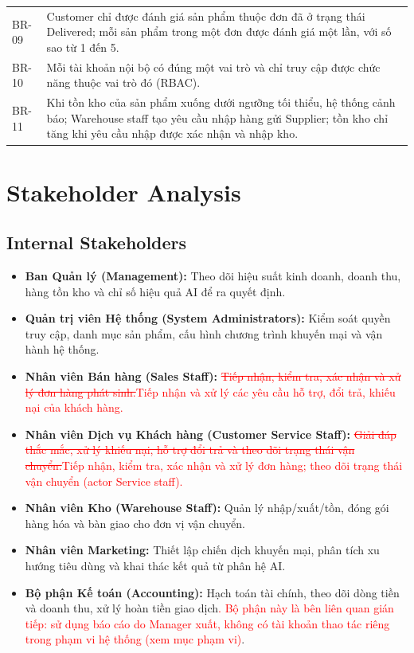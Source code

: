 \documentclass[12pt,a4paper,oneside]{report}
\newif\ifmark \marktrue
\newcommand{\chg}[1]{\ifmark\textcolor{red}{#1}\else #1\fi}
\newcommand{\del}[1]{\ifmark\textcolor{red}{\sout{#1}}\fi}
\newenvironment{chgblock}{\ifmark\color{red}\fi}{}
\begin{document}
\begin{chgblock}
\begin{longtable}{p{1.4cm}p{14.4cm}}
BR-09 & Customer chỉ được đánh giá sản phẩm thuộc đơn đã ở trạng thái Delivered; mỗi sản phẩm trong một đơn được đánh giá một lần, với số sao từ 1 đến 5. \\
BR-10 & Mỗi tài khoản nội bộ có đúng một vai trò và chỉ truy cập được chức năng thuộc vai trò đó (RBAC). \\
BR-11 & Khi tồn kho của sản phẩm xuống dưới ngưỡng tối thiểu, hệ thống cảnh báo; Warehouse staff tạo yêu cầu nhập hàng gửi Supplier; tồn kho chỉ tăng khi yêu cầu nhập được xác nhận và nhập kho. \\
\end{longtable}
\end{chgblock}

\section{Stakeholder Analysis}

\subsection{Internal Stakeholders}

\begin{itemize}
  \item \textbf{Ban Quản lý (Management):} Theo dõi hiệu suất kinh doanh, doanh thu, hàng tồn kho và chỉ số hiệu quả AI để ra quyết định.
  \item \textbf{Quản trị viên Hệ thống (System Administrators):} Kiểm soát quyền truy cập, danh mục sản phẩm, cấu hình chương trình khuyến mại và vận hành hệ thống.
  \item \textbf{Nhân viên Bán hàng (Sales Staff):} \del{Tiếp nhận, kiểm tra, xác nhận và xử lý đơn hàng phát sinh.}\chg{Tiếp nhận và xử lý các yêu cầu hỗ trợ, đổi trả, khiếu nại của khách hàng.}
  \item \textbf{Nhân viên Dịch vụ Khách hàng (Customer Service Staff):} \del{Giải đáp thắc mắc, xử lý khiếu nại, hỗ trợ đổi trả và theo dõi trạng thái vận chuyển.}\chg{Tiếp nhận, kiểm tra, xác nhận và xử lý đơn hàng; theo dõi trạng thái vận chuyển (actor Service staff).}
  \item \textbf{Nhân viên Kho (Warehouse Staff):} Quản lý nhập/xuất/tồn, đóng gói hàng hóa và bàn giao cho đơn vị vận chuyển.
  \item \textbf{Nhân viên Marketing:} Thiết lập chiến dịch khuyến mại, phân tích xu hướng tiêu dùng và khai thác kết quả từ phân hệ AI.
  \item \textbf{Bộ phận Kế toán (Accounting):} Hạch toán tài chính, theo dõi dòng tiền và doanh thu, xử lý hoàn tiền giao dịch\chg{. Bộ phận này là bên liên quan gián tiếp: sử dụng báo cáo do Manager xuất, không có tài khoản thao tác riêng trong phạm vi hệ thống (xem mục phạm vi)}.
\end{itemize}
\end{document}
